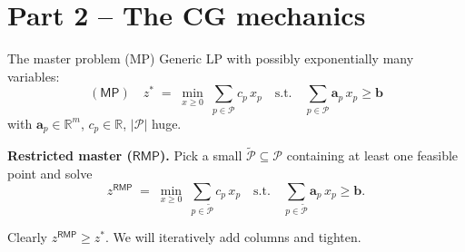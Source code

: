 \documentclass[10pt,aspectratio=169]{beamer}
\newcommand{\R}{\mathbb{R}}
\newcommand{\rmp}{\mathsf{RMP}}
\newcommand{\masterp}{\mathsf{MP}}
\begin{document}
\section{Part 2 -- The CG mechanics}

\begin{frame}{The master problem (MP)}
  Generic LP with possibly exponentially many variables:
  \[
    (\masterp)\quad
    z^* \;=\; \min_{x\ge 0}\;\sum_{p\in\mathcal P} c_p\, x_p
    \quad\text{s.t.}\quad
    \sum_{p\in\mathcal P} \mathbf a_p\, x_p \ge \mathbf b
  \]
  with $\mathbf a_p\in\R^m$, $c_p\in\R$, $|\mathcal P|$ huge.

  \medskip
  \textbf{Restricted master ($\rmp$).} Pick a small $\widetilde{\mathcal P}\subseteq\mathcal P$
  containing at least one feasible point and solve
  \[
     z^{\rmp} \;=\; \min_{x\ge 0}\;\sum_{p\in\widetilde{\mathcal P}} c_p\, x_p
     \quad\text{s.t.}\quad
     \sum_{p\in\widetilde{\mathcal P}} \mathbf a_p\, x_p \ge \mathbf b .
  \]

  Clearly $z^{\rmp}\ge z^*$. We will iteratively add columns and tighten.
\end{frame}
\end{document}
